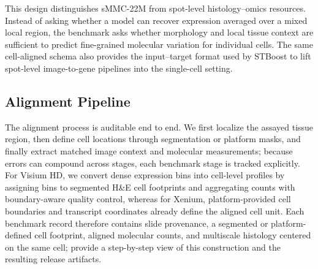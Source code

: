 \documentclass{article}
\newcommand{\dataset}{sMMC-22M\xspace}
\newcommand{\benchmarkname}{sMMC-22M Bench\xspace}
\begin{document}
This design distinguishes \dataset from spot-level histology--omics resources. Instead of asking whether a model can recover expression averaged over a mixed local region, the benchmark asks whether morphology and local tissue context are sufficient to predict fine-grained molecular variation for individual cells. The same cell-aligned schema also provides the input--target format used by STBoost to lift spot-level image-to-gene pipelines into the single-cell setting.

\subsection{Alignment Pipeline}
The alignment process is auditable end to end. We first localize the assayed tissue region, then define cell locations through segmentation or platform masks, and finally extract matched image context and molecular measurements; because errors can compound across stages, each benchmark stage is tracked explicitly. For Visium HD, we convert dense expression bins into cell-level profiles by assigning bins to segmented H\&E cell footprints and aggregating counts with boundary-aware quality control, whereas for Xenium, platform-provided cell boundaries and transcript coordinates already define the aligned cell unit. Each benchmark record therefore contains slide provenance, a segmented or platform-defined cell footprint, aligned molecular counts, and multiscale histology centered on the same cell;  provide a step-by-step view of this construction and the resulting release artifacts.



\end{document}
